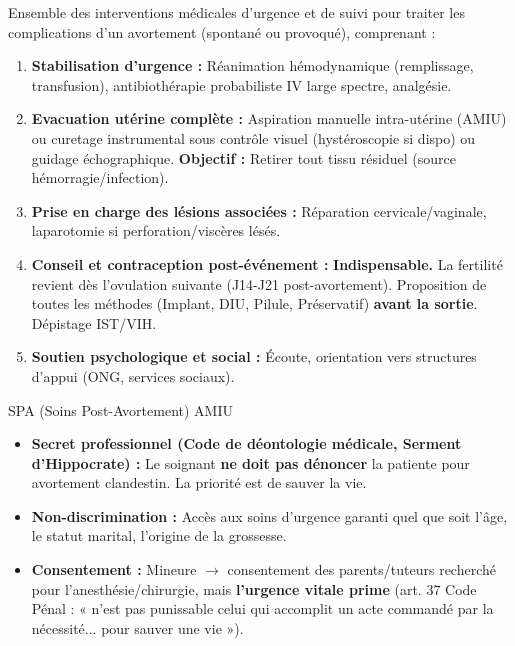 \documentclass[11pt]{article}
\newcommand{\cle}[1]{{\popxbold\color{popdark}#1}}
\begin{document}
\begin{definition}
Ensemble des interventions médicales d'urgence et de suivi pour traiter les complications d'un avortement (spontané ou provoqué), comprenant :
\begin{enumerate}
    \item \textbf{Stabilisation d'urgence :} Réanimation hémodynamique (remplissage, transfusion), antibiothérapie probabiliste IV large spectre, analgésie.
    \item \textbf{Evacuation utérine complète :} Aspiration manuelle intra-utérine (AMIU) ou curetage instrumental sous contrôle visuel (hystéroscopie si dispo) ou guidage échographique. \textbf{Objectif :} Retirer tout tissu résiduel (source hémorragie/infection).
    \item \textbf{Prise en charge des lésions associées :} Réparation cervicale/vaginale, laparotomie si perforation/viscères lésés.
    \item \textbf{Conseil et contraception post-événement :} \textbf{Indispensable.} La fertilité revient dès l'ovulation suivante (J14-J21 post-avortement). Proposition de toutes les méthodes (Implant, DIU, Pilule, Préservatif) \textbf{avant la sortie}. Dépistage IST/VIH.
    \item \textbf{Soutien psychologique et social :} Écoute, orientation vers structures d'appui (ONG, services sociaux).
\end{enumerate}
\cle{SPA (Soins Post-Avortement)} \cle{AMIU}
\end{definition}

\begin{propriete}
\begin{itemize}
    \item \textbf{Secret professionnel (Code de déontologie médicale, Serment d'Hippocrate) :} Le soignant \textbf{ne doit pas dénoncer} la patiente pour avortement clandestin. La priorité est de sauver la vie.
    \item \textbf{Non-discrimination :} Accès aux soins d'urgence garanti quel que soit l'âge, le statut marital, l'origine de la grossesse.
    \item \textbf{Consentement :} Mineure $\to$ consentement des parents/tuteurs recherché pour l'anesthésie/chirurgie, mais \textbf{l'urgence vitale prime} (art. 37 Code Pénal : « n'est pas punissable celui qui accomplit un acte commandé par la nécessité... pour sauver une vie »).
\end{itemize}
\end{propriete}
\end{document}

